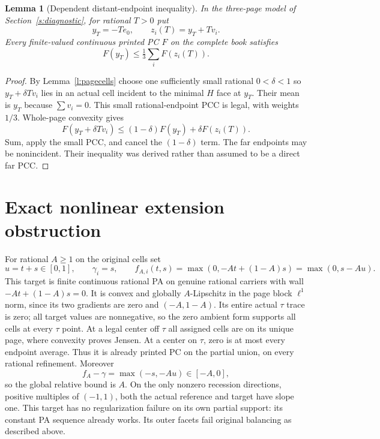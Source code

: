 \documentclass[11pt]{article}
\newtheorem{lemma}[theorem]{Lemma}
\theoremstyle{definition}\newtheorem{definition}[theorem]{Definition}
\theoremstyle{remark}\newtheorem{remark}[theorem]{Remark}
\begin{document}
\begin{lemma}[Dependent distant-endpoint inequality]\label{l:far}
In the three-page model of Section~\ref{s:diagnostic}, for rational $T>0$ put
\[
 y_T=-T e_0,\qquad z_i(T)=y_T+T v_i.
\]
Every finite-valued continuous printed PC $F$ on the complete book satisfies
\[
 F(y_T)\leq\tfrac13\sum_i F(z_i(T)).
\]
\end{lemma}
\begin{proof}
By Lemma~\ref{l:pagecells} choose one sufficiently small rational $0<\delta<1$ so $y_T+\delta T v_i$ lies in an actual cell incident to the minimal $H$ face at $y_T$. Their mean is $y_T$ because $\sum v_i=0$. This small rational-endpoint PCC is legal, with weights $1/3$. Whole-page convexity gives
\[
 F(y_T+\delta T v_i)\leq(1-\delta)F(y_T)+\delta F(z_i(T)).
\]
Sum, apply the small PCC, and cancel the $(1-\delta)$ term. The far endpoints may be nonincident. Their inequality was derived rather than assumed to be a direct far PCC.
\end{proof}

\section{Exact nonlinear extension obstruction}\label{s:exact}
For rational $A\geq1$ on the original cells set
\[
 u=t+s\in[0,1],\qquad \gamma_i=s,\qquad
 f_{A,i}(t,s)=\max(0,-At+(1-A)s)=\max(0,s-Au).
\]
This target is finite continuous rational PA on genuine rational carriers with wall $-At+(1-A)s=0$. It is convex and globally $A$-Lipschitz in the page block $\ell^1$ norm, since its two gradients are zero and $(-A,1-A)$. Its entire actual $\tau$ trace is zero; all target values are nonnegative, so the zero ambient form supports all cells at every $\tau$ point. At a legal center off $\tau$ all assigned cells are on its unique page, where convexity proves Jensen. At a center on $\tau$, zero is at most every endpoint average. Thus it is already printed PC on the partial union, on every rational refinement. Moreover
\[
 f_A-\gamma=\max(-s,-Au)\in[-A,0],
\]
so the global relative bound is $A$. On the only nonzero recession directions, positive multiples of $(-1,1)$, both the actual reference and target have slope one. This target has no regularization failure on its own partial support: its constant PA sequence already works. Its outer facets fail original balancing as described above.
\end{document}

